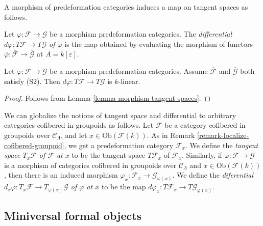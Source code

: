 \noindent
A morphism of predeformation categories induces a map on tangent spaces as 
follows.

\begin{definition}
\label{definition-differential}
Let $\varphi: \mathcal{F} \to \mathcal G$ be a morphism predeformation 
categories. The {\it differential $d \varphi: T \mathcal{F} \to T 
\mathcal G$ of $\varphi$} is the map obtained by evaluating the morphism of 
functors $\overline{\varphi}: \overline{\mathcal{F}} \to  
\overline{\mathcal G}$ at $A = k[\varepsilon]$.
\end{definition}

\begin{lemma}
\label{lemma-k-linear-differential}
Let $\varphi: \mathcal{F} \to \mathcal G$ be a morphism predeformation 
categories. Assume $\overline{\mathcal{F}}$ and $\overline{\mathcal G}$ both 
satisfy (S2).  Then $d \varphi: T \mathcal{F} \to T 
\mathcal G$ is $k$-linear.
\end{lemma}

\begin{proof}
Follows from Lemma \ref{lemma-morphism-tangent-spaces}.
\end{proof}

\begin{remark}
\label{remark-tangent-space-cofibered-groupoid}
We can globalize the notions of tangent space and differential to arbitrary 
categories cofibered in groupoids as follows. Let $\mathcal{F}$ be a category 
cofibered in groupoids over $\mathcal{C}_\Lambda$, and let $x \in 
\text{Ob}(\mathcal{F}(k))$.  As in Remark 
\ref{remark-localize-cofibered-groupoid}, we get a predeformation category 
$\mathcal{F}_x$.  We define the {\it tangent space $T_x \mathcal{F}$ of 
$\mathcal{F}$ at $x$} to be the tangent space $T \mathcal{F}_x$ of $\mathcal 
F_x$.  Similarly, if $\varphi: \mathcal{F} \to \mathcal G$ is a morphism 
of categories cofibered in groupoids over $\mathcal{C}_\Lambda$ and $x \in 
\text{Ob}(\mathcal{F}(k))$, then there is an induced morphism $\varphi_x: 
\mathcal{F}_x \to \mathcal G_{\varphi(x)}$.  We define the 
{\it diferential $d_{x} \varphi: T_{x} \mathcal{F} \to T_{\varphi(x)} 
\mathcal G$ of $\varphi$ at $x$} to be the map $d \varphi_x: T \mathcal{F}_x 
\to T \mathcal G_{\varphi(x)}$.
\end{remark}



\subsection{Miniversal formal objects}
\label{subsection-miniversal-objects-existence}

